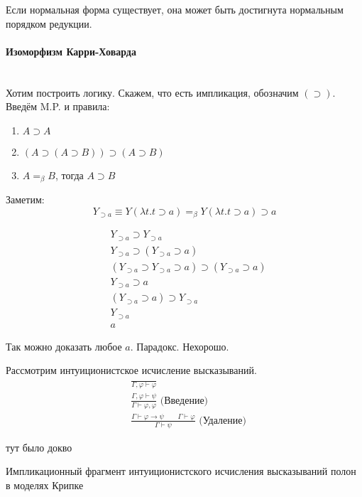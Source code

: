 \begin{statement}
    Если нормальная форма существует, она может быть достигнута нормальным порядком редукции.
\end{statement}

\paragraph{Изоморфизм Карри-Ховарда} \mbox{} \\

Хотим построить логику.
Скажем, что есть импликация, обозначим $(\supset)$. Введём M.P. и правила:
\begin{enumerate}
    \item $A \supset A$
    \item $(A \supset (A \supset B)) \supset (A \supset B)$
    \item $A =_{\beta} B$, тогда $A \supset B$
\end{enumerate}

Заметим:
\[
    Y_{\supset a} \equiv Y (\lambda t . t \supset a) =_{\beta} Y (\lambda t . t \supset a) \supset a
\]

\begin{align*}
    &Y_{\supset a} \supset Y_{\supset a} \\
    &Y_{\supset a} \supset (Y_{\supset a} \supset a) \\
    &(Y_{\supset a} \supset Y_{\supset a} \supset a) \supset (Y_{\supset a} \supset a) \\
    &Y_{\supset a} \supset a \\
    &(Y_{\supset a} \supset a) \supset Y_{\supset a} \\
    &Y_{\supset a} \\
    &a
\end{align*}

Так можно доказать любое $a$. Парадокс. Нехорошо.

Рассмотрим интуиционистское исчисление высказываний.
\begin{align*}
    &\frac{}{\Gamma, \varphi \vdash \varphi} \\
    &\frac{\Gamma, \varphi \vdash \psi}{\Gamma \vdash \varphi, \varphi} \text{ (Введение)} \\
    &\frac{\Gamma \vdash \varphi \rightarrow \psi \qquad \Gamma \vdash \varphi}{\Gamma \vdash \psi} \text{ (Удаление)}
\end{align*}

тут было докво

\begin{theorem}
    Импликационный фрагмент интуиционистского исчисления высказываний полон в моделях Крипке
\end{theorem}
